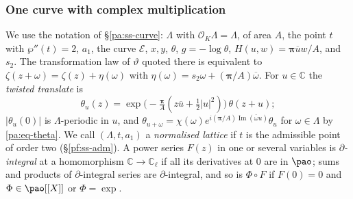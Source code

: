\documentclass[10pt]{amsart}
\theoremstyle{definition}
\theoremstyle{remark}
\newcommand{\C}{\mathbb C}
\newcommand{\Iml}{\operatorname{Im}}
\providecommand{\auO}{\mathcal O}
\providecommand{\aubar}[1]{\overline{#1}}
\begin{document}
\subsubsection{One curve with complex multiplication}\label{pk:ss-curve}

We use the notation of \S\ref{pa:ss-curve}: $\Lambda$ with $\auO_K\Lambda=\Lambda$, of area $A$,
the point $t$ with $\wp''(t)=2$, $a_1$, the curve $\mathcal E$, $x,y$, $\theta$, $g=-\log\theta$,
$H(u,w)=\boldsymbol\pi\aubar uw/A$, and $s_2$. The transformation law of $\vartheta$ quoted there
is equivalent to $\zeta(z+\omega)=\zeta(z)+\eta(\omega)$ with
$\eta(\omega)=s_2\omega+(\boldsymbol\pi/A)\aubar\omega$. For $u\in\C$ the \emph{twisted translate} is
\[
\theta_u(z)=\exp\bigl(-\tfrac{\boldsymbol\pi}A(z\aubar u+\tfrac12|u|^2)\bigr)\,\theta(z+u);
\]
$|\theta_u(0)|$ is $\Lambda$-periodic in $u$, and $\theta_{u+\omega}=\chi(\omega)e^{i(\boldsymbol\pi/A)
\Iml(\aubar\omega u)}\theta_u$ for $\omega\in\Lambda$ by \eqref{pa:eq-theta}. We call
$(\Lambda,t,a_1)$ a \emph{normalised lattice} if $t$ is the admissible point of order two
(\S\ref{pf:ss-adm}). A power series $F(z)$ in one or several variables
is \emph{$\partial$-integral} at a homomorphism $\C\to\C_\ell$ if all its derivatives at $0$ are in
$\pao$; sums and products of $\partial$-integral series are $\partial$-integral, and so is
$\Phi\circ F$ if $F(0)=0$ and $\Phi\in\pao[[X]]$ or $\Phi=\exp$.
\end{document}
